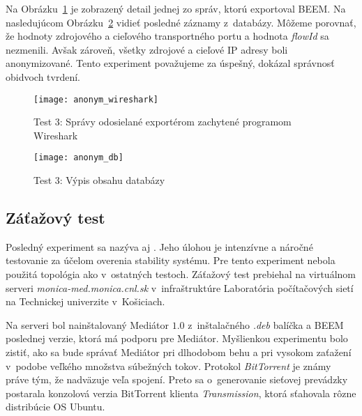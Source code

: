 Na Obrázku~\ref{o:anonym_wireshark} je zobrazený detail jednej zo správ, ktorú exportoval BEEM. 
Na nasledujúcom Obrázku~\ref{o:anonym_db} vidieť posledné záznamy z~databázy. Môžeme porovnať, že hodnoty 
zdrojového a cieľového transportného portu a hodnota \emph{flowId} sa nezmenili. Avšak zároveň, všetky 
zdrojové a cieľové IP adresy boli anonymizované. Tento experiment považujeme za úspešný, dokázal správnosť 
obidvoch tvrdení.

\begin{figure}[ht!]
\centering
\texttt{[image: anonym\_wireshark]}
\caption{Test 3: Správy odosielané exportérom zachytené programom Wireshark}\label{o:anonym_wireshark}
\end{figure}

\begin{figure}[ht!]
\centering
\texttt{[image: anonym\_db]}
\caption{Test 3: Výpis obsahu databázy}\label{o:anonym_db}
\end{figure}





\subsection{Záťažový test}

Posledný experiment sa nazýva aj . Jeho úlohou je intenzívne a náročné testovanie 
za účelom overenia stability systému. Pre tento experiment nebola použitá topológia ako v~ostatných testoch.
Záťažový test prebiehal na virtuálnom serveri \emph{monica-med.monica.cnl.sk} v~infraštruktúre Laboratória
počítačových sietí na Technickej univerzite v~Košiciach.

Na serveri bol nainštalovaný Mediátor $1.0$ z~inštalačného \emph{.deb} balíčka a BEEM poslednej verzie, ktorá 
má podporu pre Mediátor. Myšlienkou experimentu bolo zistiť, ako sa bude správať Mediátor pri dlhodobom 
behu a pri vysokom zaťažení v~podobe veľkého množstva súbežných tokov. Protokol \emph{BitTorrent}
\citep{bittorrent} je známy práve tým, že nadväzuje veľa spojení. Preto sa o~generovanie sieťovej 
prevádzky postarala konzolová verzia BitTorrent klienta \emph{Transmission}, ktorá sťahovala rôzne 
distribúcie OS Ubuntu.

